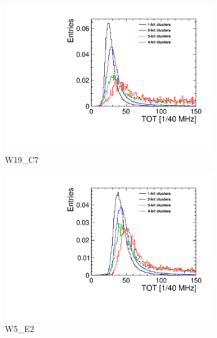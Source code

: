 \begin{figure}[htbp] \centering
  \begin{subfigure}[b]{0.3\textwidth}
    \includegraphics[width=\textwidth]{./figures/Calibration/TOT_Clusters_W0019_C07.pdf}
    \caption{W19\_C7}
  \end{subfigure} \hfill
  \begin{subfigure}[b]{0.3\textwidth}
    \includegraphics[width=\textwidth]{./figures/Calibration/TOT_Clusters_W0005_E02.pdf}
    \caption{W5\_E2}
  \end{subfigure}\hfill
  \begin{subfigure}[b]{0.3\textwidth}

\end{subfigure}
\end{figure}
